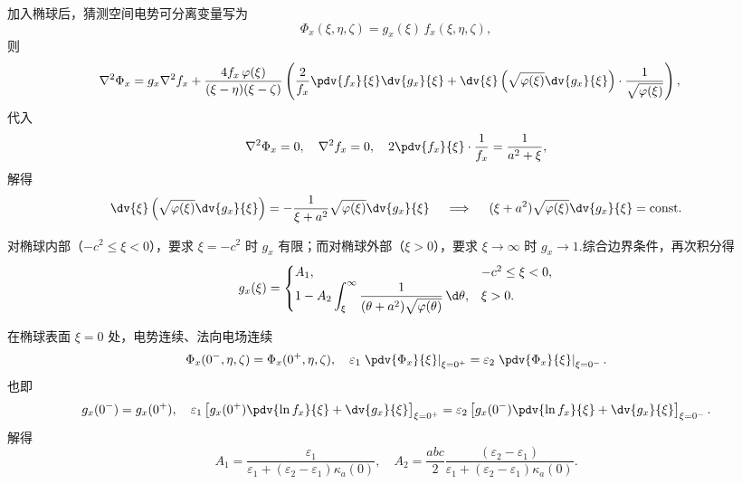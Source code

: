 加入椭球后，猜测空间电势可分离变量写为
\begin{equation*}
	\Phi_x(\xi, \eta, \zeta) = g_x(\xi)\, f_x(\xi, \eta, \zeta),
\end{equation*}
则
\begin{align*}
	\nabla^2 \Phi_x =\; & g_x \nabla^2 f_x + \frac{4 f_x\, \varphi(\xi)}{(\xi - \eta)(\xi - \zeta)} \left(
	\frac{2}{f_x} \pdv{f_x}{\xi} \dv{g_x}{\xi} +
	\dv{\xi} \left( \sqrt{\varphi(\xi)} \dv{g_x}{\xi} \right) \cdot \frac{1}{\sqrt{\varphi(\xi)}}
	\right),
\end{align*}
代入
\begin{equation*}
	\nabla^2 \Phi_x = 0,\quad\nabla^2 f_x = 0,\quad
	2 \pdv{f_x}{\xi} \cdot\frac{1}{f_x} = \frac{1}{a^2 + \xi},
\end{equation*}
解得
\begin{equation*}
	\dv{\xi} \left( \sqrt{\varphi(\xi)} \dv{g_x}{\xi} \right) = -\frac{1}{\xi + a^2} \sqrt{\varphi(\xi)} \dv{g_x}{\xi}\quad\implies\quad(\xi + a^2) \sqrt{\varphi(\xi)} \dv{g_x}{\xi} = \text{const}.
\end{equation*}

对椭球内部（\(-c^2 \leq \xi < 0\)），要求 \(\xi = -c^2\) 时 \(g_x\) 有限；而对椭球外部（\(\xi > 0\)），要求 \(\xi \to \infty\) 时 \(g_x \to 1\).综合边界条件，再次积分得
\begin{equation*}
	g_x(\xi) =
	\begin{cases}
		A_1,                                                                                                  & -c^2 \leq \xi < 0, \\
		1 - A_2 \displaystyle\int_{\xi}^{\infty} \frac{1}{(\theta + a^2) \sqrt{\varphi(\theta)}}\, \d \theta, & \xi > 0.
	\end{cases}
\end{equation*}

在椭球表面 \(\xi = 0\) 处，电势连续、法向电场连续
\begin{equation*}
	\Phi_x(0^-, \eta, \zeta) = \Phi_x(0^+, \eta, \zeta), \quad
	\varepsilon_1 \left. \pdv{\Phi_x}{\xi} \right|_{\xi = 0^+} = \varepsilon_2 \left. \pdv{\Phi_x}{\xi} \right|_{\xi = 0^-}.
\end{equation*}
也即
\begin{equation*}
	g_x(0^-) = g_x(0^+), \quad
	\varepsilon_1 \left[ g_x(0^+) \pdv{\ln f_x}{\xi} + \dv{g_x}{\xi} \right]_{\xi = 0^+} =
	\varepsilon_2 \left[ g_x(0^-) \pdv{\ln f_x}{\xi} + \dv{g_x}{\xi} \right]_{\xi = 0^-}.
\end{equation*}
解得
\begin{equation*}
	A_1 = \frac{\varepsilon_1}{\varepsilon_1 + (\varepsilon_2 - \varepsilon_1) \kappa_a(0)}, \quad
	A_2 = \frac{abc}{2}\frac{(\varepsilon_2 - \varepsilon_1)}{\varepsilon_1 + (\varepsilon_2 - \varepsilon_1)\kappa_a(0)}.
\end{equation*}

